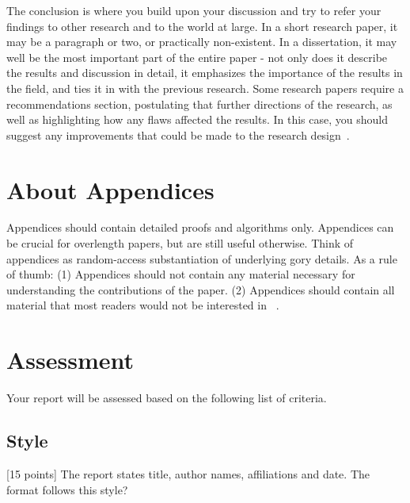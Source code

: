\documentclass{winslabreport}
\begin{document}
The conclusion is where you build upon your discussion and try to refer your findings to other research and to the world at large. In a short research paper, it may be a paragraph or two, or practically non-existent. In a dissertation, it may well be the most important part of the entire paper - not only does it describe the results and discussion in detail, it emphasizes the importance of the results in the field, and ties it in with the previous research. Some research papers require a recommendations section, postulating that further directions of the research, as well as highlighting how any flaws affected the results. In this case, you should suggest any improvements that could be made to the research design~\cite{Shuttleworth2016}.




\appendix

\section{About Appendices}

Appendices should contain detailed proofs and algorithms only. Appendices can be crucial for overlength papers, but are still useful otherwise. Think of appendices as random-access substantiation of underlying gory details. As a rule of thumb: (1) Appendices should not contain any material necessary for understanding the contributions of the paper. (2) Appendices should contain all material that most readers would not be interested in ~\cite{Widom2006}.

\section{Assessment}

Your report will be assessed based on the following list of criteria.


\subsection{Style}
[15 points] The report states  title, author names, affiliations and date. The format follows this style?
\end{document}
